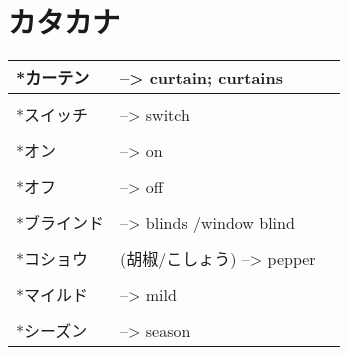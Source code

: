 \documentclass{article}
\begin{document}




\part*{カタカナ}
\begin{tabular}{ p{3cm} | l l }
*カーテン&--> curtain; curtains \\ \hline\\[-1em]
*スイッチ&--> switch \\ \hline\\[-1em]
*オン&--> on \\ \hline\\[-1em]
*オフ&--> off \\ \hline\\[-1em]
*ブラインド&--> blinds /window blind \\ \hline\\[-1em]
*コショウ&(胡椒/こしょう) --> pepper \\ \hline\\[-1em]
*マイルド&--> mild \\ \hline\\[-1em]
*シーズン&--> season
\end{tabular}

\end{document}
